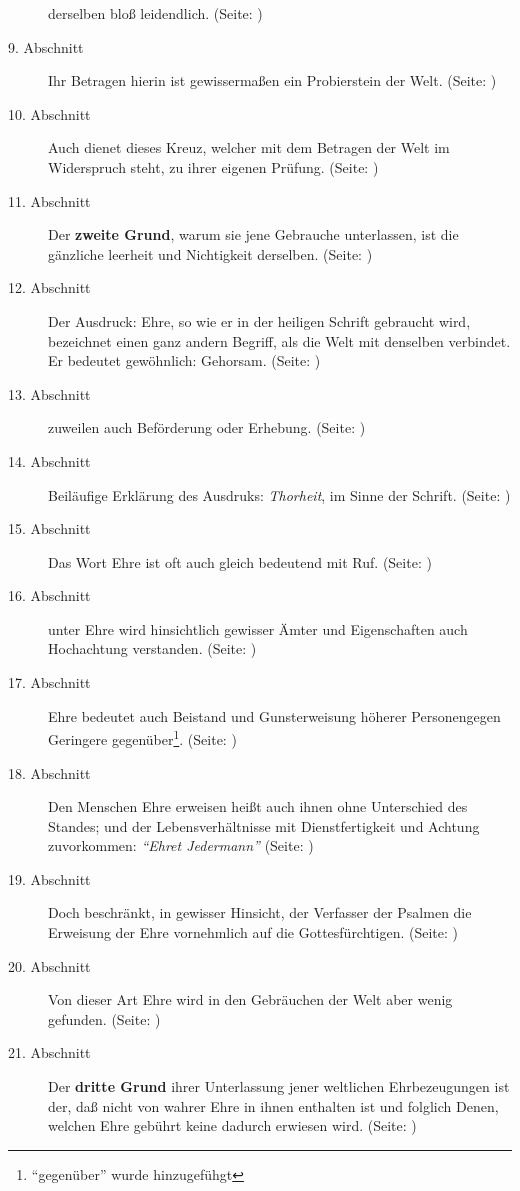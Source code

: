 \begin{description}
derselben bloß leidendlich. (Seite: \pageref{kap9_ab8})
\item[9. Abschnitt] Ihr Betragen hierin ist gewissermaßen ein Probierstein der
Welt. (Seite: \pageref{kap9_ab9})
\item[10. Abschnitt] Auch dienet dieses Kreuz, welcher mit dem Betragen der Welt
im Widerspruch steht, zu ihrer eigenen Prüfung. (Seite: \pageref{kap9_ab10})
\item[11. Abschnitt] Der \textbf{zweite Grund}, warum sie jene Gebrauche unterlassen, ist
die gänzliche leerheit und Nichtigkeit derselben. (Seite: \pageref{kap9_ab11})
\item[12. Abschnitt] Der Ausdruck: Ehre, so wie er in der heiligen Schrift
gebraucht wird, bezeichnet einen ganz andern Begriff, als die Welt mit denselben
verbindet. Er bedeutet gewöhnlich: Gehorsam. (Seite: \pageref{kap9_ab12})
\item[13. Abschnitt] zuweilen auch Beförderung oder Erhebung. (Seite: \pageref{kap9_ab13})
\item[14. Abschnitt] Beiläufige Erklärung des Ausdruks: \textit{Thorheit}, im Sinne
der Schrift. (Seite: \pageref{kap9_ab14})
\item[15. Abschnitt] Das Wort Ehre ist oft auch gleich bedeutend mit Ruf. (Seite: \pageref{kap9_ab15})
\item[16. Abschnitt] unter Ehre wird hinsichtlich gewisser Ämter und
Eigenschaften auch Hochachtung verstanden. (Seite: \pageref{kap9_ab16})
\item[17. Abschnitt] Ehre bedeutet auch Beistand und Gunsterweisung höherer
Personengegen Geringere gegenüber\footnote{"`gegenüber"' wurde hinzugefühgt}. (Seite: \pageref{kap9_ab17})
\item[18. Abschnitt]  Den Menschen Ehre erweisen heißt auch ihnen ohne
Unterschied des Standes; und der Lebensverhältnisse mit Dienstfertigkeit und
Achtung zuvorkommen: \textit{"`Ehret Jedermann"'} (Seite: \pageref{kap9_ab18})
\item[19. Abschnitt] Doch beschränkt, in gewisser Hinsicht, der Verfasser der
Psalmen die Erweisung der Ehre vornehmlich auf die Gottesfürchtigen. (Seite: \pageref{kap9_ab19})
\item[20. Abschnitt] Von dieser Art Ehre wird in den Gebräuchen der Welt aber
wenig gefunden. (Seite: \pageref{kap9_ab20})
\item[21. Abschnitt] Der \textbf{dritte Grund} ihrer Unterlassung jener weltlichen
Ehrbezeugungen ist der, daß nicht von wahrer Ehre in ihnen enthalten ist und
folglich Denen, welchen Ehre gebührt keine dadurch erwiesen wird. (Seite: \pageref{kap9_ab21})

\end{description}
